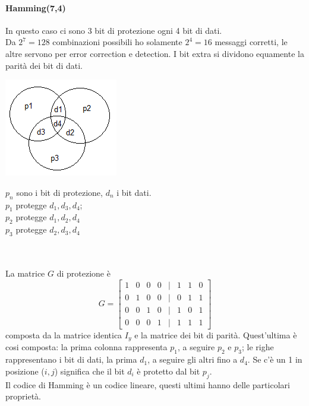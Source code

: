 \documentclass[10pt,a4paper,twoside]{article}
\begin{document}
\paragraph{Hamming(7,4)} In questo caso ci sono 3 bit di protezione ogni 4 bit di dati.\\
Da $2^7=128$ combinazioni possibili ho solamente $2^4=16$ messaggi corretti, le altre servono per error correction e detection. I bit extra si dividono equamente la parità dei bit di dati.\\
\begin{minipage}{0.25\textwidth}
\includegraphics[]{images/hamming.png}
\end{minipage}
\begin{minipage}{0.75\textwidth}
$p_n$ sono i bit di protezione, $d_n$ i bit dati.\\
$p_1$ protegge $d_1, d_3, d_4$;\\$p_2$ protegge $d_1, d_2, d_4$\\$p_3$ protegge $d_2, d_3, d_4$
\end{minipage}\\\\
La matrice $G$ di protezione è
\begin{equation}
G=
\begin{bmatrix}
1 & 0 & 0 & 0 &|& 1 & 1 & 0\\
0 & 1 & 0 & 0 &|& 0 & 1 & 1\\
0 & 0 & 1 & 0 &|& 1 & 0 & 1\\
0 & 0 & 0 & 1 &|& 1 & 1 & 1
\end{bmatrix}
\end{equation}
composta da la matrice identica $I_y$ e la matrice dei bit di parità. Quest'ultima è cosi composta: la prima colonna rappresenta $p_1$, a seguire $p_2$ e $p_3$; le righe rappresentano i bit di dati, la prima $d_1$, a seguire gli altri fino a $d_4$. Se c'è un 1 in posizione ($i,j$) significa che il bit $d_i$ è protetto dal bit $p_j$.\\
Il codice di Hamming è un codice lineare, questi ultimi hanno delle particolari proprietà.
\end{document}
